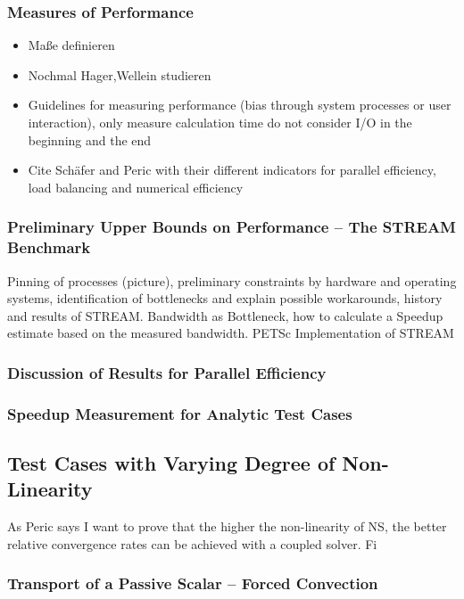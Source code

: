       \subsubsection{Measures of Performance}
        \begin{itemize}
          \item Maße definieren
          \item Nochmal Hager,Wellein studieren
          \item Guidelines for measuring performance (bias through system processes or user interaction), only measure calculation time do not consider I/O in the beginning and the end
          \item Cite Schäfer and Peric with their different indicators for parallel efficiency, load balancing and numerical efficiency
        \end{itemize}

      \subsubsection{Preliminary Upper Bounds on Performance -- The STREAM Benchmark}
        Pinning of processes (picture), preliminary constraints by hardware and operating systems, identification of bottlenecks and explain possible workarounds, history and results of STREAM. Bandwidth as Bottleneck, how to calculate a Speedup estimate based on the measured bandwidth. PETSc Implementation of STREAM

      \subsubsection{Discussion of Results for Parallel Efficiency}
      \subsubsection{Speedup Measurement for Analytic Test Cases}

    \subsection{Test Cases with Varying Degree of Non-Linearity}
      
      As Peric says I want to prove that the higher the non-linearity of NS, the better relative convergence rates can be achieved with a coupled solver. Fi

      \subsubsection{Transport of a Passive Scalar -- Forced Convection}
